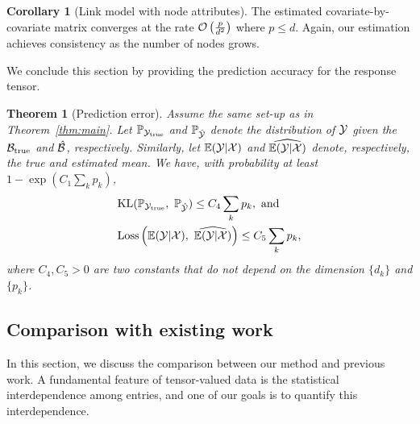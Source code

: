 \documentclass[twoside]{article}
\theoremstyle{plain}
\newtheorem{thm}{Theorem}[section]
\theoremstyle{definition}
\newtheorem{cor}{Corollary}
\begin{document}
\begin{cor} [Link model with node attributes] The estimated covariate-by-covariate matrix converges at the rate $\mathcal{O}\left({p\over d^2}\right)$ where $p\leq d$. Again, our estimation achieves consistency as the number of nodes grows. 
\end{cor}

We conclude this section by providing the prediction accuracy for the response tensor.  

\begin{thm} [Prediction error]
Assume the same set-up as in Theorem~\ref{thm:main}. Let $\mathbb{P}_{\mathcal{Y}_{\text{true}}}$ and $\mathbb{P}_{\hat {\mathcal{Y}}}$ denote the distribution of $\mathcal{Y}$ given the $\mathcal{B}_{\text{true}}$ and $\hat {\mathcal{B}}$, respectively. Similarly, let $\mathbb{E}(\mathcal{Y}|\mathcal{X})$ and $\widehat{\mathbb{E}(\mathcal{Y}|\mathcal{X})}$ denote, respectively, the true and estimated mean. We have, with probability at least $1-\exp(C_1\sum_k p_k)$,
\begin{align}
&\text{KL}(\mathbb{P}_{\tY_{\text{true}}},\ \mathbb{P}_{\hat \tY})\leq C_4 \sum_k p_k,\ \text{and}\\
&\text{Loss}\left(\mathbb{E}(\tY|\tX),\ \widehat{\mathbb{E}(\tY|\tX)}\right)\leq C_5 \sum_k p_k,
\end{align}
where $C_4, C_5>0$ are two constants that do not depend on the dimension $\{d_k\}$ and $\{p_k\}$.
\end{thm}

\subsection{Comparison with existing work}\label{sec:compare}
In this section, we discuss the comparison between our method and previous work.  A fundamental feature of tensor-valued data is the statistical interdependence among entries, and one of our goals is to quantify this interdependence. 
\end{document}

